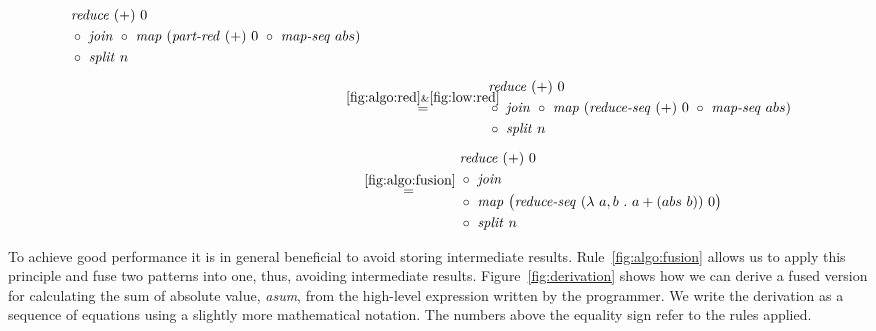 \begin{figure*}[t]
\begin{align*}
\begin{aligned}
      \begin{aligned}
        & \reduce\ (+)\ 0\\
        &\circ\ \join\ \circ\ \map\ (\partRed\ (+)\ 0\ \circ\ \mapSeq\ abs)\\
        &\circ\ \splitN\ n
      \end{aligned}\\[.5em]
  & \overset{\hspace{-1.3em}\ref{fig:algo:red}\& \ref{fig:low:red}\hspace{-1.1em}}{=\hspace{.2em}}
      \begin{aligned}
        & \reduce\ (+)\ 0\\
        &\circ\ \join\ \circ\ \map\ (\reduceSeq\ (+)\ 0\ \circ\ \mapSeq\ abs)\\
        &\circ\ \splitN\ n
      \end{aligned}\\[.5em]
  & \overset{\ref{fig:algo:fusion}}{=\hspace{.2em}}
      \begin{aligned}
        & \reduce\ (+)\ 0\\
        &\circ\ \join\\
        &\circ\ \map\ \big(\reduceSeq\ (\lambda\ a, b\ .\ a+(abs\ b))\ 0\big)\\
        &\circ\ \splitN\ n
      \end{aligned}
  \end{aligned}
\end{align*}
\caption{Derivation for \emph{asum}$(\vec{x})$ to a fused parallel version.
  The numbers above the equality sign refer to the rules from sections ....
}
\label{fig:derivation}
\end{figure*}




To achieve good performance it is in general beneficial to avoid storing intermediate results.
Rule~\ref{fig:algo:fusion} allows us to apply this principle and fuse two patterns into one, thus, avoiding intermediate results.
Figure~\ref{fig:derivation} shows how we can derive a fused version for calculating the sum of absolute value, \emph{asum}, from the high-level expression written by the programmer.
We write the derivation as a sequence of equations using a slightly more mathematical notation.
The numbers above the equality sign refer to the rules applied.

